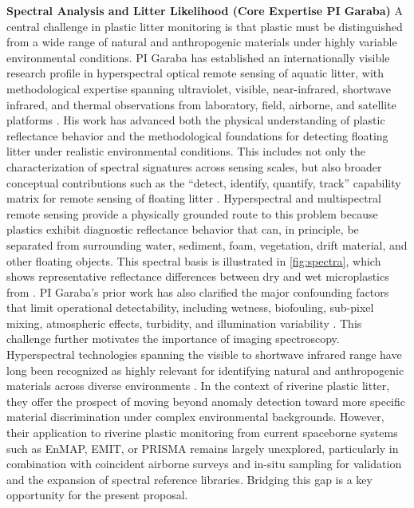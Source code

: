 \documentclass{scrartcl}
\begin{document}
\textbf{Spectral Analysis and Litter Likelihood (Core Expertise PI Garaba)} A central challenge in plastic litter monitoring is that plastic must be distinguished from a wide range of natural and anthropogenic materials under highly variable environmental conditions. PI Garaba has established an internationally visible research profile in hyperspectral optical remote sensing of aquatic litter, with methodological expertise spanning ultraviolet, visible, near-infrared, shortwave infrared, and thermal observations from laboratory, field, airborne, and satellite platforms \citep{garaba2018airborne,garaba2020uvswir,garaba2022toa,garaba2021concentration,garaba2024riverine,ohall6138760plastic}. His work has advanced both the physical understanding of plastic reflectance behavior and the methodological foundations for detecting floating litter under realistic environmental conditions. This includes not only the characterization of spectral signatures across sensing scales, but also broader conceptual contributions such as the \enquote{detect, identify, quantify, track} capability matrix for remote sensing of floating litter \citep{garaba2024riverine}. Hyperspectral and multispectral remote sensing provide a physically grounded route to this problem because plastics exhibit diagnostic reflectance behavior that can, in principle, be separated from surrounding water, sediment, foam, vegetation, drift material, and other floating objects. This spectral basis is illustrated in \cref{fig:spectra}, which shows representative reflectance differences between dry and wet microplastics from \citep{garaba2018airborne}. PI Garaba’s prior work has also clarified the major confounding factors that limit operational detectability, including wetness, biofouling, sub-pixel mixing, atmospheric effects, turbidity, and illumination variability \citep{garaba2018airborne,garaba2020uvswir,garaba2024riverine}.  This challenge further motivates the importance of imaging spectroscopy. Hyperspectral technologies spanning the visible to shortwave infrared range have long been recognized as highly relevant for identifying natural and anthropogenic materials across diverse environments \citep{cloutis1989spectral,kuhn2004hydrocarbon,goddijn2018concept,knaeps2021hyperspectral,de2023hyperspectral,ohall6138760plastic}. In the context of riverine plastic litter, they offer the prospect of moving beyond anomaly detection toward more specific material discrimination under complex environmental backgrounds. However, their application to riverine plastic monitoring from current spaceborne systems such as EnMAP, EMIT, or PRISMA remains largely unexplored, particularly in combination with coincident airborne surveys and in-situ sampling for validation and the expansion of spectral reference libraries. Bridging this gap is a key opportunity for the present proposal.
\end{document}
